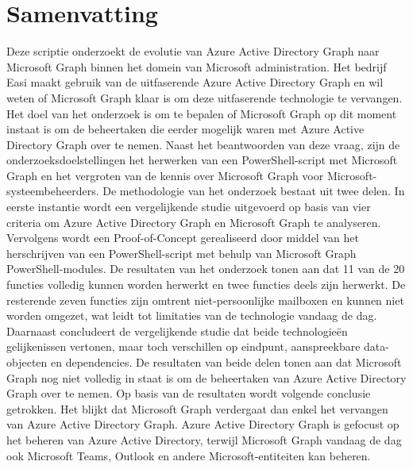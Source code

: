 
%
%
%
%
\chapter*{Samenvatting}
Deze scriptie onderzoekt de evolutie van Azure Active Directory Graph naar Microsoft Graph binnen het domein van Microsoft administration. Het bedrijf Easi maakt gebruik van de uitfaserende Azure Active Directory Graph en wil weten of Microsoft Graph klaar is om deze uitfaserende technologie te vervangen. Het doel van het onderzoek is om te bepalen of Microsoft Graph op dit moment instaat is om de beheertaken die eerder mogelijk waren met Azure Active Directory Graph over te nemen. Naast het beantwoorden van deze vraag, zijn de onderzoeksdoelstellingen het herwerken van een PowerShell-script met Microsoft Graph en het vergroten van de kennis over Microsoft Graph voor Microsoft-systeembeheerders. De methodologie van het onderzoek bestaat uit twee delen. In eerste instantie wordt een vergelijkende studie uitgevoerd op basis van vier criteria om Azure Active Directory Graph en Microsoft Graph te analyseren. Vervolgens wordt een Proof-of-Concept gerealiseerd door middel van het herschrijven van een PowerShell-script met behulp van Microsoft Graph PowerShell-modules. De resultaten van het onderzoek tonen aan dat 11 van de 20 functies volledig kunnen worden herwerkt en twee functies deels zijn herwerkt. De resterende zeven functies zijn omtrent niet-persoonlijke mailboxen en kunnen niet worden omgezet, wat leidt tot limitaties van de technologie vandaag de dag. Daarnaast concludeert de vergelijkende studie dat beide technologieën gelijkenissen vertonen, maar toch verschillen op eindpunt, aanspreekbare data-objecten en dependencies. De resultaten van beide delen tonen aan dat Microsoft Graph nog niet volledig in staat is om de beheertaken van Azure Active Directory Graph over te nemen. Op basis van de resultaten wordt volgende conclusie getrokken. Het blijkt dat Microsoft Graph verdergaat dan enkel het vervangen van Azure Active Directory Graph. Azure Active Directory Graph is gefocust op het beheren van Azure Active Directory, terwijl Microsoft Graph vandaag de dag ook Microsoft Teams, Outlook en andere Microsoft-entiteiten kan beheren. 

